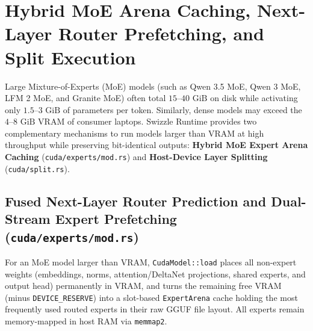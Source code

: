 \documentclass[10pt,a4paper]{article}
\theoremstyle{swzstyle}
\newcommand{\code}[1]{\texttt{#1}}
\begin{document}
\section{Hybrid MoE Arena Caching, Next-Layer Router Prefetching, and Split Execution}

Large Mixture-of-Experts (MoE) models (such as Qwen 3.5 MoE, Qwen 3 MoE, LFM 2 MoE, and Granite MoE) often total $15\text{--}40\text{ GiB}$ on disk while activating only $1.5\text{--}3\text{ GiB}$ of parameters per token. Similarly, dense models may exceed the $4\text{--}8\text{ GiB}$ VRAM of consumer laptops. Swizzle Runtime provides two complementary mechanisms to run models larger than VRAM at high throughput while preserving bit-identical outputs: \textbf{Hybrid MoE Expert Arena Caching} (\code{cuda/experts/mod.rs}) and \textbf{Host-Device Layer Splitting} (\code{cuda/split.rs}).

\subsection{Fused Next-Layer Router Prediction and Dual-Stream Expert Prefetching (\texttt{cuda/experts/mod.rs})}

For an MoE model larger than VRAM, \code{CudaModel::load} places all non-expert weights (embeddings, norms, attention/DeltaNet projections, shared experts, and output head) permanently in VRAM, and turns the remaining free VRAM (minus \code{DEVICE\_RESERVE}) into a slot-based \code{ExpertArena} cache holding the most frequently used routed experts in their raw GGUF file layout. All experts remain memory-mapped in host RAM via \code{memmap2}.
\end{document}
